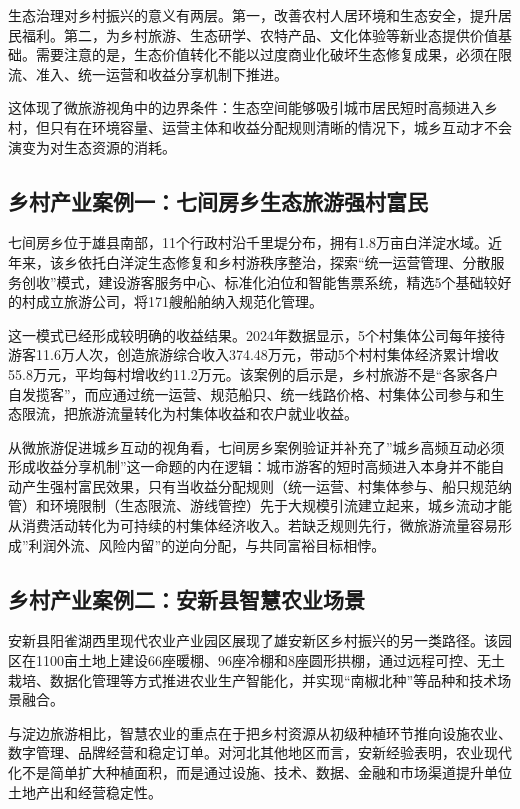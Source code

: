 \documentclass[UTF8,zihao=-4]{ctexart}
\begin{document}
生态治理对乡村振兴的意义有两层。第一，改善农村人居环境和生态安全，提升居民福利。第二，为乡村旅游、生态研学、农特产品、文化体验等新业态提供价值基础。需要注意的是，生态价值转化不能以过度商业化破坏生态修复成果，必须在限流、准入、统一运营和收益分享机制下推进。

这体现了微旅游视角中的边界条件：生态空间能够吸引城市居民短时高频进入乡村，但只有在环境容量、运营主体和收益分配规则清晰的情况下，城乡互动才不会演变为对生态资源的消耗。

\subsection{乡村产业案例一：七间房乡生态旅游强村富民}

七间房乡位于雄县南部，11个行政村沿千里堤分布，拥有1.8万亩白洋淀水域。近年来，该乡依托白洋淀生态修复和乡村游秩序整治，探索“统一运营管理、分散服务创收”模式，建设游客服务中心、标准化泊位和智能售票系统，精选5个基础较好的村成立旅游公司，将171艘船舶纳入规范化管理。

这一模式已经形成较明确的收益结果。2024年数据显示，5个村集体公司每年接待游客11.6万人次，创造旅游综合收入374.48万元，带动5个村村集体经济累计增收55.8万元，平均每村增收约11.2万元。该案例的启示是，乡村旅游不是“各家各户自发揽客”，而应通过统一运营、规范船只、统一线路价格、村集体公司参与和生态限流，把旅游流量转化为村集体收益和农户就业收益。

从微旅游促进城乡互动的视角看，七间房乡案例验证并补充了”城乡高频互动必须形成收益分享机制”这一命题的内在逻辑：城市游客的短时高频进入本身并不能自动产生强村富民效果，只有当收益分配规则（统一运营、村集体参与、船只规范纳管）和环境限制（生态限流、游线管控）先于大规模引流建立起来，城乡流动才能从消费活动转化为可持续的村集体经济收入。若缺乏规则先行，微旅游流量容易形成”利润外流、风险内留”的逆向分配，与共同富裕目标相悖。

\subsection{乡村产业案例二：安新县智慧农业场景}

安新县阳雀湖西里现代农业产业园区展现了雄安新区乡村振兴的另一类路径。该园区在1100亩土地上建设66座暖棚、96座冷棚和8座圆形拱棚，通过远程可控、无土栽培、数据化管理等方式推进农业生产智能化，并实现“南椒北种”等品种和技术场景融合。

与淀边旅游相比，智慧农业的重点在于把乡村资源从初级种植环节推向设施农业、数字管理、品牌经营和稳定订单。对河北其他地区而言，安新经验表明，农业现代化不是简单扩大种植面积，而是通过设施、技术、数据、金融和市场渠道提升单位土地产出和经营稳定性。
\end{document}

